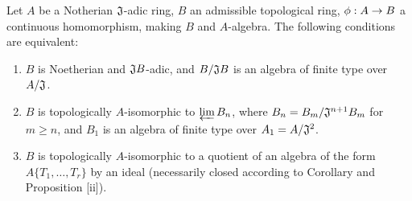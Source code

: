 \begin{prop}[7.5.5]
\label{0.7.5.5}
Let $A$ be a Notherian $\mathfrak{J}$-adic ring, $B$ an admissible topological ring,
$\vphi:A\to B$ a continuous homomorphism, making $B$ and $A$-algebra. The following
conditions are equivalent:
\begin{enumerate}[label=\emph{(\alph*)}]
  \item $B$ is Noetherian and $\mathfrak{J}B$-adic, and $B/\mathfrak{J}B$ is an
    algebra of finite type over $A/\mathfrak{J}$.
  \item $B$ is topologically $A$-isomorphic to $\varprojlim B_n$, where
    $B_n=B_m/\mathfrak{J}^{n+1}B_m$ for $m\geqslant n$, and $B_1$ is an algebra of finite
    type over $A_1=A/\mathfrak{J}^2$.
  \item $B$ is topologically $A$-isomorphic to a quotient of an algebra of the form
    $A\{T_1,\dots,T_r\}$ by an ideal (necessarily closed according to
    Corollary  and Proposition [ii]).
\end{enumerate}
\end{prop}

